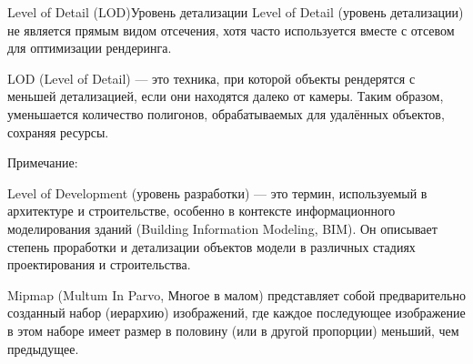 \documentclass{beamer}
\begin{document}
	\begin{frame}{Level of Detail (LOD)}{Уровень детализации}
		Level of Detail (уровень детализации) не является прямым видом отсечения, хотя часто используется вместе с отсевом для оптимизации рендеринга. 

		LOD (Level of Detail) --- это техника, при которой объекты рендерятся с меньшей детализацией, если они находятся далеко от камеры. Таким образом, уменьшается количество полигонов, обрабатываемых для удалённых объектов, сохраняя ресурсы.

		{ \footnotesize

		Примечание:

		Level of Development (уровень разработки) — это термин, используемый в архитектуре и строительстве, особенно в контексте информационного моделирования зданий (Building Information Modeling, BIM). Он описывает степень проработки и детализации объектов модели в различных стадиях проектирования и строительства.

		Mipmap (Multum In Parvo, Многое в малом) представляет собой предварительно созданный набор (иерархию) изображений, где каждое последующее изображение в этом наборе имеет размер в половину (или в другой пропорции) меньший, чем предыдущее.
		
		\\

		}

	\end{frame}
\end{document}
